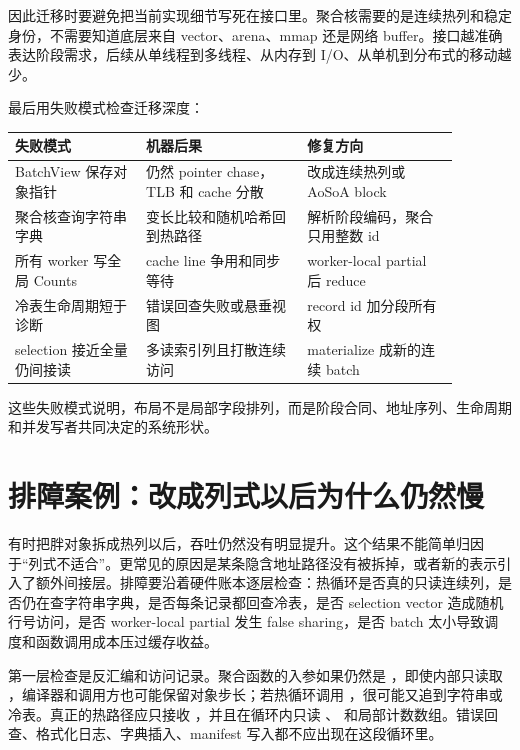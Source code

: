 因此迁移时要避免把当前实现细节写死在接口里。聚合核需要的是连续热列和稳定身份，不需要知道底层来自 vector、arena、mmap 还是网络 buffer。接口越准确表达阶段需求，后续从单线程到多线程、从内存到 I/O、从单机到分布式的移动越少。

最后用失败模式检查迁移深度：

\begin{center}
\small
\begin{tabular}{@{}p{0.26\linewidth}p{0.32\linewidth}p{0.30\linewidth}@{}}
\toprule
失败模式 & 机器后果 & 修复方向 \\
\midrule
BatchView 保存对象指针 & 仍然 pointer chase，TLB 和 cache 分散 & 改成连续热列或 AoSoA block \\
聚合核查询字符串字典 & 变长比较和随机哈希回到热路径 & 解析阶段编码，聚合只用整数 id \\
所有 worker 写全局 Counts & cache line 争用和同步等待 & worker-local partial 后 reduce \\
冷表生命周期短于诊断 & 错误回查失败或悬垂视图 & record id 加分段所有权 \\
selection 接近全量仍间接读 & 多读索引列且打散连续访问 & materialize 成新的连续 batch \\
\bottomrule
\end{tabular}
\end{center}

这些失败模式说明，布局不是局部字段排列，而是阶段合同、地址序列、生命周期和并发写者共同决定的系统形状。

\section{排障案例：改成列式以后为什么仍然慢}

有时把胖对象拆成热列以后，吞吐仍然没有明显提升。这个结果不能简单归因于“列式不适合”。更常见的原因是某条隐含地址路径没有被拆掉，或者新的表示引入了额外间接层。排障要沿着硬件账本逐层检查：热循环是否真的只读连续列，是否仍在查字符串字典，是否每条记录都回查冷表，是否 selection vector 造成随机行号访问，是否 worker-local partial 发生 false sharing，是否 batch 太小导致调度和函数调用成本压过缓存收益。

第一层检查是反汇编和访问记录。聚合函数的入参如果仍然是 ，即使内部只读取 ，编译器和调用方也可能保留对象步长；若热循环调用 ，很可能又追到字符串或冷表。真正的热路径应只接收 ，并且在循环内只读 、 和局部计数数组。错误回查、格式化日志、字典插入、manifest 写入都不应出现在这段循环里。

